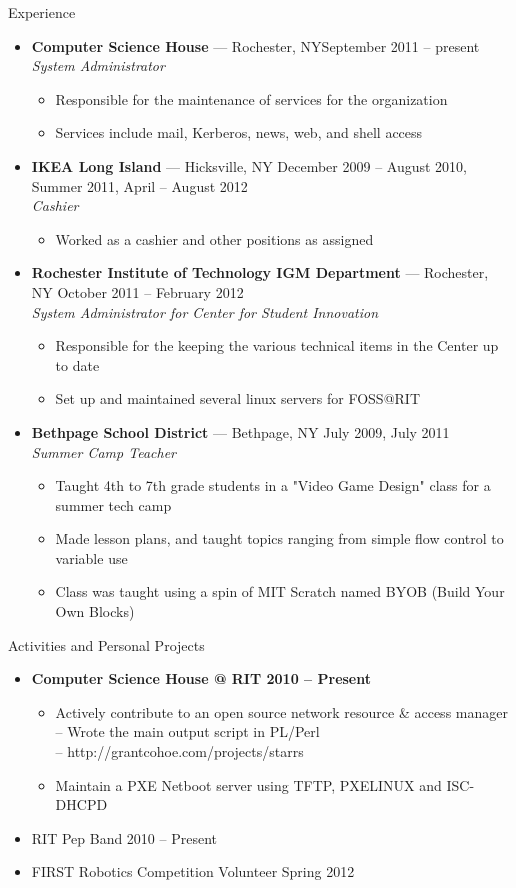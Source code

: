 \documentclass[10pt,oneside]{article}
\newenvironment{ressection}[1]{
	\vspace{3pt}
	{\fontfamily{ppl}\selectfont\Large#1}
	\begin{itemize}
	\vspace{2pt}
}{
	\end{itemize}
}
\newcommand{\resitem}[1]{
	\vspace{-2pt}
	\item \begin{flushleft} #1 \end{flushleft}
}
\newcommand{\ressubitem}[1]{
	\vspace{-1pt}
	\item \begin{flushleft} #1 \end{flushleft}
}
\newcommand{\resbigitem}[3]{
	\vspace{-3pt}
	\item
	\textbf{#1} --- #2 \\
	\textit{#3}
}
\newenvironment{ressubsec}[3]{
	\resbigitem{#1}{#2}{#3}
	\vspace{-1pt}
	\begin{itemize}
}{
	\end{itemize}
}
\newenvironment{reslist}[1]{
	\resitem{\textbf{#1}}
	\vspace{-3pt}
	\begin{itemize}
}{
	\end{itemize}
}
\begin{document}
\begin{ressection}{Experience}

	\begin{ressubsec}{Computer Science House}{Rochester, NY\hfill September 2011 -- present}{System Administrator}
		\ressubitem{Responsible for the maintenance of services for the organization}
		\ressubitem{Services include mail, Kerberos, news, web, and shell access}
	\end{ressubsec}
	\begin{ressubsec}{IKEA Long Island}{Hicksville, NY \hfill December 2009 -- August 2010,  Summer 2011,  April -- August 2012}{Cashier}
		\ressubitem{Worked as a cashier and other positions as assigned}
	\end{ressubsec}
	\begin{ressubsec}{Rochester Institute of Technology IGM Department}{Rochester, NY \hfill October 2011 -- February 2012}{System Administrator for Center for Student Innovation}
		\ressubitem{Responsible for the keeping the various technical items in the Center up to date}
		\ressubitem{Set up and maintained several linux servers for FOSS@RIT}
	\end{ressubsec}
	\begin{ressubsec}{Bethpage School District}{Bethpage, NY \hfill July 2009,  July 2011}{Summer Camp Teacher}
		\ressubitem{Taught 4th to 7th grade students in a "Video Game Design" class for a summer tech camp}
		\ressubitem{Made lesson plans, and taught topics ranging from simple flow control to variable use}
		\ressubitem{Class was taught using a spin of MIT Scratch named BYOB (Build Your Own Blocks)}
	\end{ressubsec}

\end{ressection}


\begin{ressection}{Activities and Personal Projects}
	\begin{reslist}{Computer Science House @ RIT \hfill 2010 -- Present}
		\ressubitem{Actively contribute to an open source network resource \& access manager \\
			\hspace{8pt} -- Wrote the main output script in PL/Perl \\ 
			\hspace{8pt} -- http://grantcohoe.com/projects/starrs}
		\ressubitem{Maintain a PXE Netboot server using TFTP, PXELINUX and ISC-DHCPD}
	\end{reslist}
	\resitem{RIT Pep Band \hfill 2010 -- Present}
	\resitem{FIRST Robotics Competition Volunteer \hfill Spring 2012}
\end{ressection}
\end{document}
